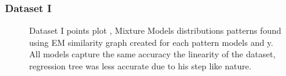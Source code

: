 \documentclass[a4paper]{article}
\begin{document}
\subsubsection{Dataset I}
\begin{figure}[ht]
\centering
{}
\caption[Optional caption for list of figures]{ Dataset I points plot ,  Mixture Models distributions patterns found using EM similarity graph created for each pattern
 models and y.
\\
All models capture the same accuracy the linearity of the dataset, regression tree was less accurate due to his step like nature. }
\label{fig:subfigureExample}

\end{figure}




\end{document}
